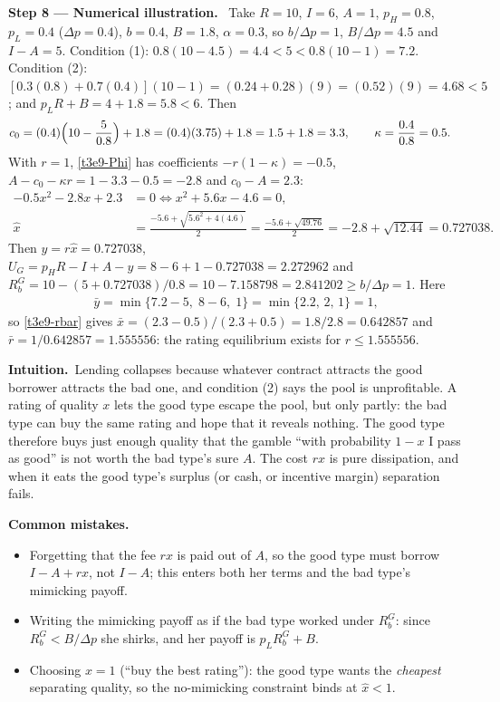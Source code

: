 \documentclass[11pt,a4paper]{article}
\newcommand{\step}[2]{\par\medskip\noindent\textbf{Step #1 --- #2.}~}
\newcommand{\intuition}{\par\medskip\noindent\textbf{Intuition.}~}
\newcommand{\pitfalls}{\par\medskip\noindent\textbf{Common mistakes.}}
\begin{document}
\step{8}{Numerical illustration} Take $R=10$, $I=6$, $A=1$, $p_H=0.8$, $p_L=0.4$ ($\Delta p=0.4$), $b=0.4$,
$B=1.8$, $\alpha=0.3$, so $b/\Delta p=1$, $B/\Delta p=4.5$ and $I-A=5$. Condition (1): $0.8(10-4.5)=4.4<5<0.8(10-1)=7.2$. Condition (2):
$[0.3(0.8)+0.7(0.4)](10-1)=(0.24+0.28)(9)=(0.52)(9)=4.68<5$; and $p_LR+B=4+1.8=5.8<6$. Then
\begin{align}
  c_0 &= (0.4)\Bigl(10-\frac{5}{0.8}\Bigr)+1.8 = (0.4)(3.75)+1.8 = 1.5+1.8 = 3.3, \qquad \kappa=\frac{0.4}{0.8}=0.5. \nonumber
\end{align}
With $r=1$, \eqref{t3e9-Phi} has coefficients $-r(1-\kappa)=-0.5$, $A-c_0-\kappa r=1-3.3-0.5=-2.8$ and $c_0-A=2.3$:
\begin{align}
  -0.5x^2-2.8x+2.3 &= 0 \iff x^2+5.6x-4.6=0, \nonumber\\
  \hat x &= \frac{-5.6+\sqrt{5.6^2+4(4.6)}}{2} = \frac{-5.6+\sqrt{49.76}}{2} = -2.8+\sqrt{12.44} = 0.727038. \nonumber
\end{align}
Then $y=r\hat x=0.727038$, $U_G=p_HR-I+A-y=8-6+1-0.727038=2.272962$
and $R_b^G=10-(5+0.727038)/0.8=10-7.158798=2.841202\ge b/\Delta p=1$. Here
\begin{align}
  \bar y=\min\{7.2-5,\;8-6,\;1\}=\min\{2.2,\,2,\,1\}=1, \nonumber
\end{align}
so \eqref{t3e9-rbar} gives $\bar x=(2.3-0.5)/(2.3+0.5)=1.8/2.8=0.642857$ and $\bar r=1/0.642857=1.555556$: the rating equilibrium exists for
$r\le1.555556$.

\intuition Lending collapses because whatever contract attracts the good borrower attracts the bad
one, and condition (2) says the pool is unprofitable. A rating of quality $x$ lets the good type escape the
pool, but only partly: the bad type can buy the same rating and hope that it reveals nothing. The good type
therefore buys just enough quality that the gamble ``with probability $1-x$ I pass as good'' is not worth
the bad type's sure $A$. The cost $rx$ is pure dissipation, and when it eats the good type's surplus (or
cash, or incentive margin) separation fails.

\pitfalls
\begin{itemize}
  \item Forgetting that the fee $rx$ is paid out of $A$, so the good type must borrow $I-A+rx$, not $I-A$; this enters both her terms and the bad type's mimicking payoff.
  \item Writing the mimicking payoff as if the bad type worked under $R_b^G$: since $R_b^G<B/\Delta p$ she shirks, and her payoff is $p_LR_b^G+B$.
  \item Choosing $x=1$ (``buy the best rating''): the good type wants the \emph{cheapest} separating quality, so the no-mimicking constraint binds at $\hat x<1$.
\end{itemize}
\end{document}
